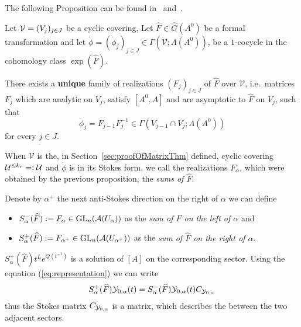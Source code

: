 The following Proposition can be found in~\cite[Prop.III.2.1]{Loday1994}
and~\cite[Thm.4.3.13]{Loday2014}.
\begin{prop}\label{prop:multisummability}
  Let $\mathcal{V}=(V_j)_{j\in J}$ be a cyclic covering,
  Let $\hat F\in\hat G(A^0)$ be a formal transformation and let
  $\dot\phi=(\dot\phi_j)_{j\in J}\in\Gamma(\dot{\mathcal{V}};\Lambda(A^0))$,
  be a $1$-cocycle in the cohomology class $\exp(\hat F)$.

  There exists a \textbf{unique} family of realizations $(F_j)_{j\in J}$ of
  $\hat F$ over $\mathcal{V}$, i.e.\ matrices $F_j$ which are analytic on
  $V_j$, satisfy $[A^0,A]$ and are asymptotic to $\hat F$ on $V_j$, such that
  \[
    \dot\phi_j=F_{j-1}F_j^{-1} \in\Gamma(V_{j-1}\cap V_j;\Lambda(A^0))
  \]
  for every $j\in J$.
\end{prop}
When $\mathcal{V}$ is the, in Section~\ref{sec:proofOfMatrixThm} defined,
cyclic covering $\mathcal{U}^{\leq k_r}=:\mathcal{U}$ and $\dot\phi$ is in its Stokes
form\TODO[~(cf.~??)], we call the realizations $F_{\alpha}$, which were obtained
by the previous proposition, the \emph{sums of $\hat F$}.
\begin{defn}\label{defn:sumsLeftRight}
  Denote by $\alpha^+$ the next anti-Stokes direction on the right of $\alpha$
  we can define
  \begin{itemize}
  \item $S_\alpha^-(\widehat F):=F_\alpha\in\operatorname{GL}_n(\mathcal{A}(U_\alpha))$ as the \emph{sum
      of $\hat F$ on the left of $\alpha$} and
  \item $S_\alpha^+(\widehat F):=F_{\alpha^+}\in\operatorname{GL}_n(\mathcal{A}(U_{\alpha^+}))$ as the
    \emph{sum of $\hat F$ on the right of $\alpha$}.
  \end{itemize}
\end{defn}
\begin{rem}
  $S^+_\alpha(\hat F)t^Le^{Q(t^{-1})}$ is a solution of $[A]$ on the
  corresponding sector.
  Using the equation (\ref{eq:representation}) we can write
  \[
    S^+_\alpha(\widehat F)
    \mathcal{Y}_{0,\alpha}(t)
    =
    S^-_\alpha(\widehat F)
    \mathcal{Y}_{0,\alpha}(t)C_{\mathcal{Y}_{0,\alpha}}
  \]
  thus the Stokes matrix $C_{\mathcal{Y}_{0,\alpha}}$ is a matrix, which
  describes the  between the two adjacent sectors.
\end{rem}

